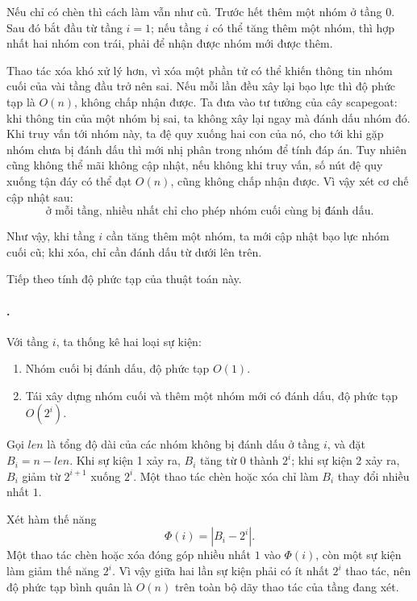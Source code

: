 \documentclass[11pt]{article}
\begin{document}
Nếu chỉ có chèn thì cách làm vẫn như cũ. Trước hết thêm một nhóm ở tầng \(0\).
Sau đó bắt đầu từ tầng \(i=1\); nếu tầng \(i\) có thể tăng thêm một nhóm, thì
hợp nhất hai nhóm con trái, phải để nhận được nhóm mới được thêm.

Thao tác xóa khó xử lý hơn, vì xóa một phần tử có thể khiến thông tin nhóm
cuối của vài tầng đầu trở nên sai. Nếu mỗi lần đều xây lại bạo lực thì độ
phức tạp là \(O(n)\), không chấp nhận được. Ta đưa vào tư tưởng của cây
scapegoat: khi thông tin của một nhóm bị sai, ta không xây lại ngay mà đánh
dấu nhóm đó. Khi truy vấn tới nhóm này, ta đệ quy xuống hai con của nó, cho
tới khi gặp nhóm chưa bị đánh dấu thì mới nhị phân trong nhóm để tính đáp án.
Tuy nhiên cũng không thể mãi không cập nhật, nếu không khi truy vấn, số nút
đệ quy xuống tận đáy có thể đạt \(O(n)\), cũng không chấp nhận được. Vì vậy
xét cơ chế cập nhật sau:
\[
  \text{ở mỗi tầng, nhiều nhất chỉ cho phép nhóm cuối cùng bị đánh dấu.}
\]

Như vậy, khi tầng \(i\) cần tăng thêm một nhóm, ta mới cập nhật bạo lực nhóm
cuối cũ; khi xóa, chỉ cần đánh dấu từ dưới lên trên.

Tiếp theo tính độ phức tạp của thuật toán này.

\paragraph{.}
Với tầng \(i\), ta thống kê hai loại sự kiện:
\begin{enumerate}
  \item Nhóm cuối bị đánh dấu, độ phức tạp \(O(1)\).
  \item Tái xây dựng nhóm cuối và thêm một nhóm mới có đánh dấu, độ phức tạp
  \(O(2^i)\).
\end{enumerate}

Gọi \(\mathit{len}\) là tổng độ dài của các nhóm không bị đánh dấu ở tầng
\(i\), và đặt \(B_i=n-\mathit{len}\). Khi sự kiện 1 xảy ra, \(B_i\) tăng từ
\(0\) thành \(2^i\); khi sự kiện 2 xảy ra, \(B_i\) giảm từ \(2^{i+1}\) xuống
\(2^i\). Một thao tác chèn hoặc xóa chỉ làm \(B_i\) thay đổi nhiều nhất \(1\).

Xét hàm thế năng
\[
  \Phi(i)=|B_i-2^i|.
\]
Một thao tác chèn hoặc xóa đóng góp nhiều nhất \(1\) vào \(\Phi(i)\), còn một
sự kiện làm giảm thế năng \(2^i\). Vì vậy giữa hai lần sự kiện phải có ít
nhất \(2^i\) thao tác, nên độ phức tạp bình quân là \(O(n)\) trên toàn bộ dãy
thao tác của tầng đang xét.
\end{document}
